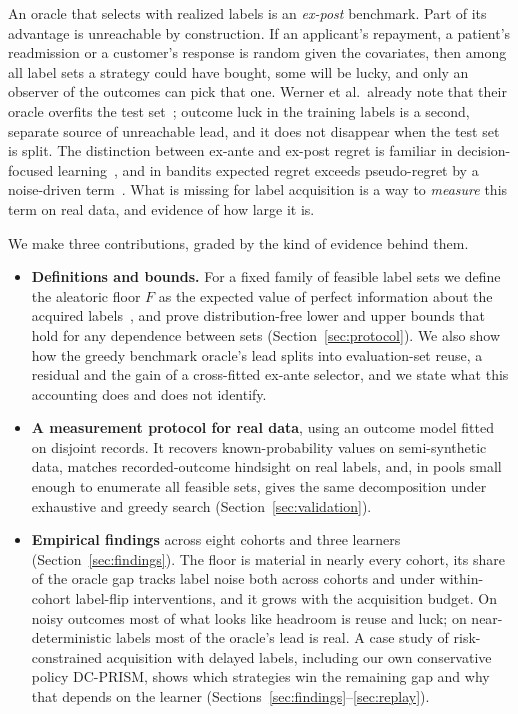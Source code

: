 \documentclass[runningheads]{llncs}
\begin{document}
An oracle that selects with realized labels is an \emph{ex-post} benchmark. Part of its advantage is unreachable by construction. If an applicant's repayment, a patient's readmission or a customer's response is random given the covariates, then among all label sets a strategy could have bought, some will be lucky, and only an observer of the outcomes can pick that one. Werner et al.\ already note that their oracle overfits the test set~\cite{werner2023comparable}; outcome luck in the training labels is a second, separate source of unreachable lead, and it does not disappear when the test set is split. The distinction between ex-ante and ex-post regret is familiar in decision-focused learning~\cite{schutte2023robust}, and in bandits expected regret exceeds pseudo-regret by a noise-driven term~\cite{bubeck2012regret,audibert2010regret}. What is missing for label acquisition is a way to \emph{measure} this term on real data, and evidence of how large it is.

We make three contributions, graded by the kind of evidence behind them.
\begin{itemize}
\item \textbf{Definitions and bounds.} For a fixed family of feasible label sets we define the aleatoric floor $F$ as the expected value of perfect information about the acquired labels~\cite{howard1966information}, and prove distribution-free lower and upper bounds that hold for any dependence between sets (Section~\ref{sec:protocol}). We also show how the greedy benchmark oracle's lead splits into evaluation-set reuse, a residual and the gain of a cross-fitted ex-ante selector, and we state what this accounting does and does not identify.
\item \textbf{A measurement protocol for real data}, using an outcome model fitted on disjoint records. It recovers known-probability values on semi-synthetic data, matches recorded-outcome hindsight on real labels, and, in pools small enough to enumerate all feasible sets, gives the same decomposition under exhaustive and greedy search (Section~\ref{sec:validation}).
\item \textbf{Empirical findings} across eight cohorts and three learners (Section~\ref{sec:findings}). The floor is material in nearly every cohort, its share of the oracle gap tracks label noise both across cohorts and under within-cohort label-flip interventions, and it grows with the acquisition budget. On noisy outcomes most of what looks like headroom is reuse and luck; on near-deterministic labels most of the oracle's lead is real. A case study of risk-constrained acquisition with delayed labels, including our own conservative policy DC-PRISM, shows which strategies win the remaining gap and why that depends on the learner (Sections~\ref{sec:findings}--\ref{sec:replay}).
\end{itemize}
\end{document}
